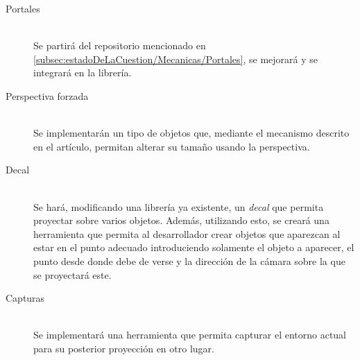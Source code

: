 \begin{description}
	\item[Portales] \hfill \\ Se partirá del repositorio mencionado en \ref{subsec:estadoDeLaCuestion/Mecanicas/Portales}, se mejorará y se integrará en la librería.
	\item[Perspectiva forzada] \hfill \\ Se implementarán un tipo de objetos que, mediante el mecanismo descrito en el artículo, permitan alterar su tamaño usando la perspectiva.
	\item[Decal] \hfill \\ Se hará, modificando una librería ya existente, un \textit{decal} que permita proyectar sobre varios objetos. Además, utilizando esto, se creará una herramienta que permita al desarrollador crear objetos que aparezcan al estar en el punto adecuado introduciendo solamente el objeto a aparecer, el punto desde donde debe de verse y la dirección de la cámara sobre la que se proyectará este.
	\item[Capturas] \hfill \\ Se implementará una herramienta que permita capturar el entorno actual para su posterior proyección en otro lugar.
\end{description}

